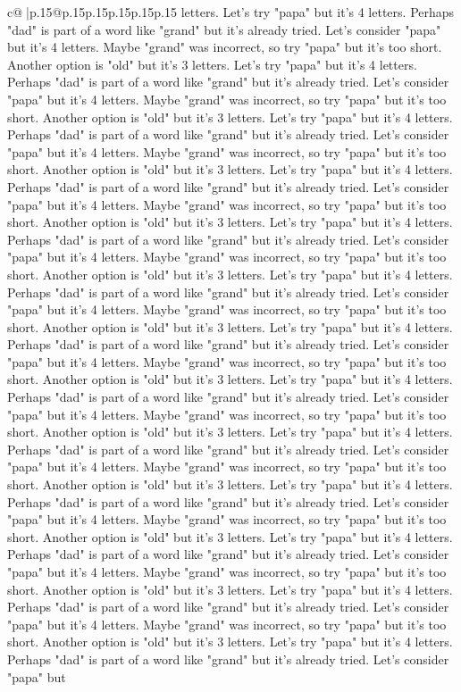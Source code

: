 \documentclass{article}
\begin{document}
{\begin{supertabular}{c@{$\;$}|p{.15\linewidth}@{}p{.15\linewidth}p{.15\linewidth}p{.15\linewidth}p{.15\linewidth}p{.15\linewidth}}
{{{letters. Let's try "papa" but it's 4 letters. Perhaps "dad" is part of a word like "grand" but it's already tried. Let's consider "papa" but it's 4 letters. Maybe "grand" was incorrect, so try "papa" but it's too short. Another option is "old" but it's 3 letters. Let's try "papa" but it's 4 letters. Perhaps "dad" is part of a word like "grand" but it's already tried. Let's consider "papa" but it's 4 letters. Maybe "grand" was incorrect, so try "papa" but it's too short. Another option is "old" but it's 3 letters. Let's try "papa" but it's 4 letters. Perhaps "dad" is part of a word like "grand" but it's already tried. Let's consider "papa" but it's 4 letters. Maybe "grand" was incorrect, so try "papa" but it's too short. Another option is "old" but it's 3 letters. Let's try "papa" but it's 4 letters. Perhaps "dad" is part of a word like "grand" but it's already tried. Let's consider "papa" but it's 4 letters. Maybe "grand" was incorrect, so try "papa" but it's too short. Another option is "old" but it's 3 letters. Let's try "papa" but it's 4 letters. Perhaps "dad" is part of a word like "grand" but it's already tried. Let's consider "papa" but it's 4 letters. Maybe "grand" was incorrect, so try "papa" but it's too short. Another option is "old" but it's 3 letters. Let's try "papa" but it's 4 letters. Perhaps "dad" is part of a word like "grand" but it's already tried. Let's consider "papa" but it's 4 letters. Maybe "grand" was incorrect, so try "papa" but it's too short. Another option is "old" but it's 3 letters. Let's try "papa" but it's 4 letters. Perhaps "dad" is part of a word like "grand" but it's already tried. Let's consider "papa" but it's 4 letters. Maybe "grand" was incorrect, so try "papa" but it's too short. Another option is "old" but it's 3 letters. Let's try "papa" but it's 4 letters. Perhaps "dad" is part of a word like "grand" but it's already tried. Let's consider "papa" but it's 4 letters. Maybe "grand" was incorrect, so try "papa" but it's too short. Another option is "old" but it's 3 letters. Let's try "papa" but it's 4 letters. Perhaps "dad" is part of a word like "grand" but it's already tried. Let's consider "papa" but it's 4 letters. Maybe "grand" was incorrect, so try "papa" but it's too short. Another option is "old" but it's 3 letters. Let's try "papa" but it's 4 letters. Perhaps "dad" is part of a word like "grand" but it's already tried. Let's consider "papa" but it's 4 letters. Maybe "grand" was incorrect, so try "papa" but it's too short. Another option is "old" but it's 3 letters. Let's try "papa" but it's 4 letters. Perhaps "dad" is part of a word like "grand" but it's already tried. Let's consider "papa" but it's 4 letters. Maybe "grand" was incorrect, so try "papa" but it's too short. Another option is "old" but it's 3 letters. Let's try "papa" but it's 4 letters. Perhaps "dad" is part of a word like "grand" but it's already tried. Let's consider "papa" but it's 4 letters. Maybe "grand" was incorrect, so try "papa" but it's too short. Another option is "old" but it's 3 letters. Let's try "papa" but it's 4 letters. Perhaps "dad" is part of a word like "grand" but it's already tried. Let's consider "papa" but }}}
\end{supertabular}}
\end{document}
